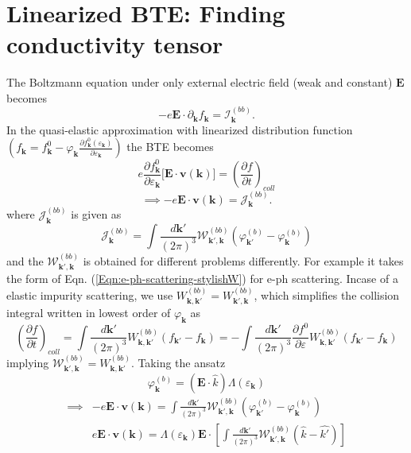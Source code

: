 \documentclass{article}
\begin{document}
\section{Linearized BTE: Finding conductivity tensor}
The Boltzmann equation under only external electric field (weak and constant) $\mathbf{E}$ becomes
\begin{equation}
	-e\mathbf{E} \cdot \partial_{\mathbf{k}} f_{\mathbf{k}} = \mathcal{I}_{\mathbf{k}}^{(bb)}.
\end{equation}
In the quasi-elastic approximation with linearized distribution function $(f_{\mathbf{k}} = f_{\mathbf{k}}^0 - \varphi_{\mathbf{k}} \frac{\partial f_{\mathbf{k}}^0 (\varepsilon_\mathbf{k})}{\partial \varepsilon_\mathbf{k}} )$ the  BTE becomes
\begin{equation}
	e \frac{\partial f_{\mathbf{k}}^0}{\partial \varepsilon_\mathbf{k}} \big[ \mathbf{E} \cdot \mathbf{v}(\mathbf{k}) \big] = \left(\frac{\partial f}{\partial t}\right)_{coll}
\end{equation}
\begin{equation}
 \implies	-e\mathbf{E} \cdot \mathbf{v}(\mathbf{k}) = \mathcal{J}_{\mathbf{k}}^{(bb)}.
\end{equation}
where $\mathcal{J}_{\mathbf{k}}^{(bb)}$ is given as
\begin{equation}
	\mathcal{J}_{\mathbf{k}}^{(bb)} = \int \frac{d\mathbf{k'}}{(2\pi)^3} \mathcal{W}_{\mathbf{k'},\mathbf{k}}^{(bb)} (\varphi_{\mathbf{k'}}^{(b)}-\varphi_{\mathbf{k}}^{(b)})
\end{equation}
and the $\mathcal{W}_{\mathbf{k'},\mathbf{k}}^{(bb)}$ is obtained for different problems differently. For example it takes the form of Eqn. (\ref{Eqn:e-ph-scattering-stylishW}) for e-ph scattering. Incase of a elastic impurity scattering, we use $W_{\mathbf{k},\mathbf{k'}}^{(bb)} = W_{\mathbf{k'},\mathbf{k}}^{(bb)}$, which simplifies the collision integral written in lowest order of $\varphi_{\mathbf{k}}$ as
\begin{equation}
	\left(\frac{\partial f}{\partial t}\right)_{coll} =  \int \frac{d\mathbf{k'}}{(2\pi)^3} W_{\mathbf{k},\mathbf{k'}}^{(bb)}(f_{\mathbf{k'}} - f_{\mathbf{k}})  = - \int \frac{d\mathbf{k'}}{(2\pi)^3} \frac{\partial f^0}{\partial \varepsilon} W_{\mathbf{k},\mathbf{k'}}^{(bb)}(f_{\mathbf{k'}} - f_{\mathbf{k}}) 
\end{equation}
implying $\mathcal{W}_{\mathbf{k'},\mathbf{k}}^{(bb)} = W_{\mathbf{k},\mathbf{k'}}^{(bb)}$. Taking the ansatz
\begin{equation}
	\varphi_{\mathbf{k}}^{(b)} = (\mathbf{E} \cdot \hat{k}) \Lambda(\varepsilon_{\mathbf{k}})
\end{equation}\begin{align}
	\implies &-e\mathbf{E} \cdot \mathbf{v}(\mathbf{k}) = \int \frac{d\mathbf{k'}}{(2\pi)^3} \mathcal{W}_{\mathbf{k'},\mathbf{k}}^{(bb)} (\varphi_{\mathbf{k'}}^{(b)}-\varphi_{\mathbf{k}}^{(b)})\\
	&e\mathbf{E} \cdot \mathbf{v}(\mathbf{k}) = \Lambda(\varepsilon_{\mathbf{k}}) \mathbf{E} \cdot [\int \frac{d\mathbf{k'}}{(2\pi)^3} \mathcal{W}_{\mathbf{k'},\mathbf{k}}^{(bb)} (\hat{k} - \hat{k'})]
\end{align}
\end{document}
